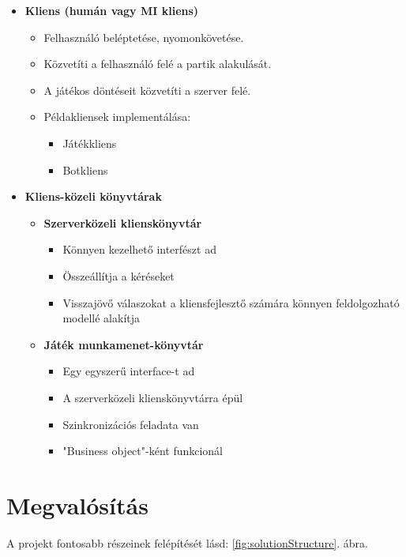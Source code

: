 \documentclass[twoside, a4paper, 12pt]{book}
\begin{document}
\begin{itemize}
\begin{itemize}
		\item \textbf{Kliens (humán vagy MI kliens)}
		\begin{itemize}
			\item Felhasználó beléptetése, nyomonkövetése.
			\item Közvetíti a felhasználó felé a partik alakulását.
			\item A játékos döntéseit közvetíti a szerver felé.
			\item Példakliensek implementálása:
			\begin{itemize}
				\item Játékkliens
				\item Botkliens
			\end{itemize}
		\end{itemize}
	\item \textbf{Kliens-közeli könyvtárak}
	\begin{itemize}
		\item \textbf{Szerverközeli klienskönyvtár}
		\begin{itemize}
			\item Könnyen kezelhető interfészt ad
			\item Összeállítja a kéréseket
			\item Visszajövő válaszokat a kliensfejlesztő számára könnyen feldolgozható modellé alakítja
		\end{itemize}
		\item \textbf{Játék munkamenet-könyvtár}
		\begin{itemize}
			\item Egy egyszerű interface-t ad
			\item A szerverközeli klienskönyvtárra épül
			\item Szinkronizációs feladata van
			\item "Business object"-ként funkcionál
		\end{itemize}
	\end{itemize}
	\end{itemize}
\end{itemize}

\newpage
\chapter{Megvalósítás}
\noindent A projekt fontosabb részeinek felépítését lásd: \ref{fig:solutionStructure}. ábra.
\end{document}
